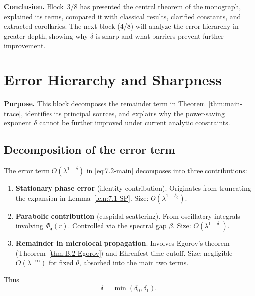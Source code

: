 \medskip
\noindent\textbf{Conclusion.}  
Block~3/8 has presented the central theorem of the monograph, explained its terms, compared it with classical results, clarified constants, and extracted corollaries. The next block (4/8) will analyze the error hierarchy in greater depth, showing why $\delta$ is sharp and what barriers prevent further improvement.


\section{Error Hierarchy and Sharpness} \label{sec:7.3}

\noindent\textbf{Purpose.}
This block decomposes the remainder term in Theorem~\ref{thm:main-trace}, identifies its principal sources, and explains why the power-saving exponent $\delta$ cannot be further improved under current analytic constraints.

\subsection{Decomposition of the error term} \label{subsec:7.3-decomp}

The error term $O(\lambda^{1-\delta})$ in \eqref{eq:7.2-main} decomposes into three contributions:

\begin{enumerate}[label=(E\arabic*)]
  \item \textbf{Stationary phase error} (identity contribution).  
  Originates from truncating the expansion in Lemma~\ref{lem:7.1-SP}.  
  Size: $O(\lambda^{1-\delta_0})$.

  \item \textbf{Parabolic contribution} (cuspidal scattering).  
  From oscillatory integrals involving $\Phi_{\mathfrak{a}}(r)$.  
  Controlled via the spectral gap $\beta$.  
  Size: $O(\lambda^{1-\delta_1})$.

  \item \textbf{Remainder in microlocal propagation}.  
  Involves Egorov’s theorem (Theorem~\ref{thm:B.2-Egorov}) and Ehrenfest time cutoff.  
  Size: negligible $O(\lambda^{-\infty})$ for fixed $\theta$, absorbed into the main two terms.
\end{enumerate}

Thus
\[
  \delta = \min(\delta_0,\delta_1).
\]

